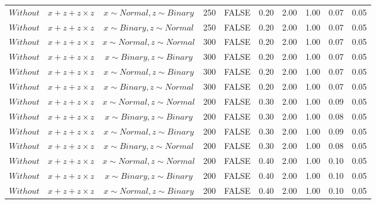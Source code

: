\begin{longtable}{lccccccccc}
  $Without$ & $\textit{x} + \textit{z} + \textit{z} \times \textit{z}$ & $\textit{x} \sim Normal, \textit{z} \sim Binary$ & 250 & FALSE & 0.20 & 2.00 & 1.00 & 0.07 & 0.05 \\ 
  $Without$ & $\textit{x} + \textit{z} + \textit{z} \times \textit{z}$ & $\textit{x} \sim Binary, \textit{z} \sim Normal$ & 250 & FALSE & 0.20 & 2.00 & 1.00 & 0.07 & 0.05 \\ 
  $Without$ & $\textit{x} + \textit{z} + \textit{z} \times \textit{z}$ & $\textit{x} \sim Normal , \textit{z} \sim Normal$ & 300 & FALSE & 0.20 & 2.00 & 1.00 & 0.07 & 0.05 \\ 
  $Without$ & $\textit{x} + \textit{z} + \textit{z} \times \textit{z}$ & $\textit{x} \sim Binary, \textit{z} \sim Binary$ & 300 & FALSE & 0.20 & 2.00 & 1.00 & 0.07 & 0.05 \\ 
  $Without$ & $\textit{x} + \textit{z} + \textit{z} \times \textit{z}$ & $\textit{x} \sim Normal, \textit{z} \sim Binary$ & 300 & FALSE & 0.20 & 2.00 & 1.00 & 0.07 & 0.05 \\ 
  $Without$ & $\textit{x} + \textit{z} + \textit{z} \times \textit{z}$ & $\textit{x} \sim Binary, \textit{z} \sim Normal$ & 300 & FALSE & 0.20 & 2.00 & 1.00 & 0.07 & 0.05 \\ 
  $Without$ & $\textit{x} + \textit{z} + \textit{z} \times \textit{z}$ & $\textit{x} \sim Normal , \textit{z} \sim Normal$ & 200 & FALSE & 0.30 & 2.00 & 1.00 & 0.09 & 0.05 \\ 
  $Without$ & $\textit{x} + \textit{z} + \textit{z} \times \textit{z}$ & $\textit{x} \sim Binary, \textit{z} \sim Binary$ & 200 & FALSE & 0.30 & 2.00 & 1.00 & 0.08 & 0.05 \\ 
  $Without$ & $\textit{x} + \textit{z} + \textit{z} \times \textit{z}$ & $\textit{x} \sim Normal, \textit{z} \sim Binary$ & 200 & FALSE & 0.30 & 2.00 & 1.00 & 0.09 & 0.05 \\ 
  $Without$ & $\textit{x} + \textit{z} + \textit{z} \times \textit{z}$ & $\textit{x} \sim Binary, \textit{z} \sim Normal$ & 200 & FALSE & 0.30 & 2.00 & 1.00 & 0.08 & 0.05 \\ 
  $Without$ & $\textit{x} + \textit{z} + \textit{z} \times \textit{z}$ & $\textit{x} \sim Normal , \textit{z} \sim Normal$ & 200 & FALSE & 0.40 & 2.00 & 1.00 & 0.10 & 0.05 \\ 
  $Without$ & $\textit{x} + \textit{z} + \textit{z} \times \textit{z}$ & $\textit{x} \sim Binary, \textit{z} \sim Binary$ & 200 & FALSE & 0.40 & 2.00 & 1.00 & 0.10 & 0.05 \\ 
  $Without$ & $\textit{x} + \textit{z} + \textit{z} \times \textit{z}$ & $\textit{x} \sim Normal, \textit{z} \sim Binary$ & 200 & FALSE & 0.40 & 2.00 & 1.00 & 0.10 & 0.05 \\ 

\end{longtable}
